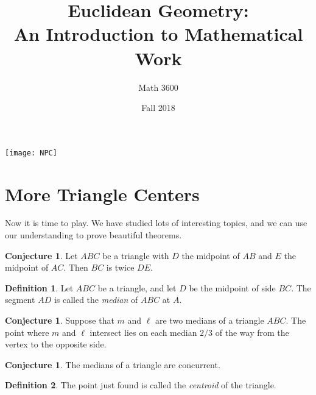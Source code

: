 \documentclass{tufte-handout}
\title{Euclidean Geometry:\\An Introduction to Mathematical Work}
\author[]{Math 3600}
\date{Fall 2018}
\theoremstyle{definition}
\newtheorem{conjecture}[problem]{Conjecture}
\newtheorem*{definition}{Definition}
\newtheorem{challenge}[problem]{Challenge}
\begin{document}
\maketitle

\begin{marginfigure}
    \texttt{[image: NPC]}
\end{marginfigure}

\setcounter{section}{17}
\section{More Triangle Centers}

Now it is time to play. We have studied lots of interesting topics, and we can use our understanding to prove beautiful theorems.

\begin{conjecture} Let $ABC$ be a triangle with $D$ the midpoint of $AB$ and $E$ the midpoint of $AC$. Then $BC$ is twice $DE$.
\end{conjecture}

\begin{definition}\label{defn:median}
Let $ABC$ be a triangle, and let $D$ be the midpoint of side $BC$. The segment $AD$ is called the \emph{median} of $ABC$ at $A$.
\end{definition}

\begin{conjecture}\label{conj:location-median}
Suppose that $m$ and $\ell $ are two medians of a triangle $ABC$.  The point where $m$ and $\ell$ intersect lies on each median $2/3$ of the way from the vertex to the opposite side.
\end{conjecture}

\begin{conjecture}\label{conj:medians-concurrent}
The medians of a triangle are concurrent.
\end{conjecture}

\begin{definition}\label{defn:centroid}
The point just found is called the \emph{centroid} of the triangle.
\end{definition}

%
\end{document}
